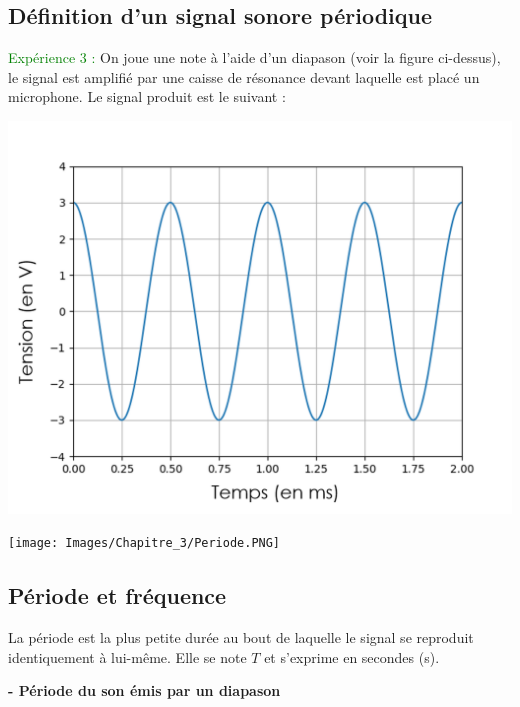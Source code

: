 \subsection{Définition d'un signal sonore périodique}
\textcolor{green}{Expérience 3 :} On joue une note à l'aide d'un diapason (voir la figure ci-dessus), le signal est amplifié par une caisse de résonance devant laquelle est placé un microphone. Le signal produit est le suivant :
\begin{multicols}{2}
\begin{center}
    \includegraphics[scale=0.5]{Images/Chapitre_3/Signal_diapason.PNG}
\end{center}
\begin{tcolorbox}
[colback=green!5!white,colframe=green!75!black,title=\textbf{Signal périodique :}]
\vspace{3cm}
\begin{center}
    \texttt{[image: Images/Chapitre\_3/Periode.PNG]}
\end{center}
\end{tcolorbox}
\end{multicols}

\subsection{Période et fréquence}
\begin{tcolorbox}
[colback=green!5!white,colframe=green!75!black,title=\textbf{Période :}, upperbox = invisible]
\vspace{1cm}La période est la plus petite durée au bout de laquelle le signal se reproduit identiquement à lui-même. Elle se note $T$ et s'exprime en secondes (s). 
\end{tcolorbox}
\begin{mdframed}[style=autreexo]
\textbf{ - Période du son émis par un diapason}\\
\end{mdframed}

